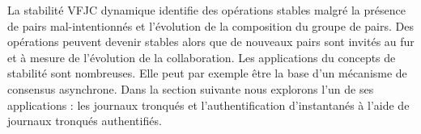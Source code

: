 La stabilité \acl{VFJC} dynamique identifie des opérations stables malgré la présence de pairs mal-intentionnés et l'évolution de la composition du groupe de pairs.
Des opérations peuvent devenir stables alors que de nouveaux pairs sont invités au fur et à mesure de l'évolution de la collaboration.
Les applications du concepts de stabilité sont nombreuses.
Elle peut par exemple être la base d'un mécanisme de consensus asynchrone.
Dans la section suivante nous explorons l'un de ses applications : les journaux tronqués et l'authentification d'instantanés à l'aide de journaux tronqués authentifiés.

%
%
%
%
%
%


